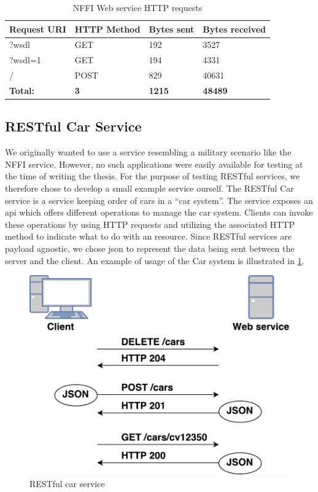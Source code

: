 \begin{table}[h]
\begin{tabular}{|l|l|l|l|}
\hline
\textbf{Request URI} & \textbf{HTTP Method} & \textbf{Bytes sent} & \textbf{Bytes received} \\ \hline
?wsdl                & GET                  & 192                 & 3527           \\ \hline
?wsdl=1              & GET                  & 194                 & 4331           \\ \hline
/                    & POST                 & 829                 & 40631          \\ \hline
\textbf{Total:}       & \textbf{3}                     & \textbf{1215}                & \textbf{48489}          \\ \hline
\end{tabular}
\caption{NFFI Web service HTTP requests}
\end{table}


\subsection{RESTful Car Service}

We originally wanted to use a service resembling a military scenario like the
NFFI service. However, no such applications were easily available for testing at
the time of writing the thesis. For the purpose of testing RESTful services, we
therefore chose to develop a small example service ourself.   The RESTful Car
service is a service keeping order of cars in a ``car system''. The service
exposes an \gls{api} which offers different operations to manage the car system.
Clients can invoke these operations by using HTTP requests and utilizing the
associated HTTP method to indicate what to do with an resource. Since RESTful
services are payload agnostic, we chose \gls{json} to represent the data being
sent between the server and the client. An example of usage of the Car system is
illustrated in \cref{figure-rest-flow}.

\begin{figure}[h]
\centering
\includegraphics[scale=0.6]{images/rest_flow.pdf}
\caption{RESTful car service}
\label{figure-rest-flow}
\end{figure}

